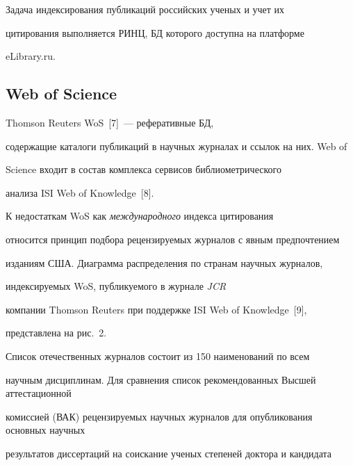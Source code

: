   Задача индексирования публикаций российских ученых и учет их


цитирования выполняется РИНЦ, БД которого доступна на платформе


{\sf eLibrary.ru}.










\subsection{Web of Science}










  Thomson Reuters WoS~[7]~--- реферативные БД,


содержащие каталоги публикаций в научных журналах и ссылок на них. Web of


Science входит в состав комплекса сервисов библиометрического


анализа ISI Web of Knowledge~[8].





  К недостаткам WoS как \textit{международного} индекса цитирования


относится принцип подбора рецензируемых журналов с явным предпочтением


изданиям США. Диаграмма распределения по странам научных журналов,


индексируемых WoS, пуб\-ли\-ку\-емо\-го в журнале \textit{JCR}


компании Thomson Reuters при поддержке ISI Web of Knowledge~[9],


представлена на рис.~2.








  Список отечественных журналов состоит из 150 наименований по всем


научным дисциплинам. Для сравнения список рекомендованных Высшей аттестационной


комиссией (ВАК) рецензируемых научных журналов для опубликования основных научных


результатов диссертаций на соискание ученых степеней доктора и кандидата


